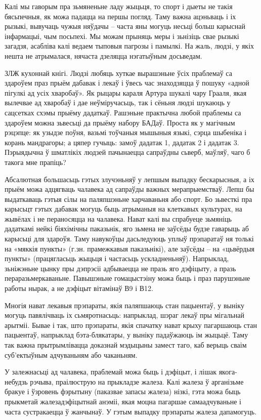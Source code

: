 Калі мы гаворым пра зьмяненьне ладу жыцьця, то спорт і дыеты не такія бясьпечныя, як можа падацца на першы погляд. Таму важна ацэньваць і іх рызыкі, вывучаць чужыя няўдачы – часта яны могуць несьці больш карыснай інфармацыі, чым посьпехі. Мы можам прыняць меры і зьнізіць свае рызыкі загадзя, асабліва калі ведаем тыповыя пагрозы і памылкі. На жаль, людзі, у якіх нешта не атрымалася, нячаста дзеляцца нэгатыўным досьведам.

ЗЛЖ кухоннай кнігі. Людзі любяць хуткае вырашэньне ўсіх праблемаў са здароўем праз прыём дабавак і лекаў і ўвесь час знаходзяцца ў пошуку «адной пігулкі ад усіх хваробаў». Як рыцары караля Артура шукалі чару Грааля, якая вылечвае ад хваробаў і дае неўміручасьць, так і сёньня людзі шукаюць у сацсетках схэмы прыёму дадаткаў. Рашэньне практычна любой праблемы са здароўем можна зьвесьці да прыёму набору БАДаў. Проста як у магічным рэцэпце: як узыдзе поўня, вазьмі тоўчаныя мышыныя языкі, сэрца шыбеніка і корань мандрагоры; а цяпер гучыць: замоў дадатак 1, дадатак 2 і дадатак 3. Пэрыядычна ў шматлікіх людзей пачынаецца сапраўдны сьверб, маўляў, чаго б такога мне прапіць?

Абсалютная большасьць гэтых злучэньняў у лепшым выпадку бескарысныя, а іх прыём можа адцягваць чалавека ад сапраўды важных мерапрыемстваў. Лепш бы выдаткаваць гэтыя сілы на паляпшэньне харчаваньня або спорт. Бо зьвесткі пра карысьцт гэтых дабавак могуць быць атрыманыя на клеткавых культурах, на жывёлах і не пераносяцца на чалавека. Нават калі вы спрабуеце зьмяніць дадаткамі нейкі біяхімічны паказьнік, яго зьмена не заўсёды будзе гаварыць аб карысьці для здароўя. Таму навукоўцы дасьледуюць уплыў прэпаратаў ня толькі на «мяккія пункты» (г.зн. прамежкавыя паказьнікі), але заўсёды – на «цьвёрдыя пункты» (працягласьць жыцьця і частасьць ускладненьняў). Напрыклад, зьніжэньне цынку пры дэпрэсіі адбываецца не празь яго дэфіцыту, а празь пераразьмеркаваньне. Павышэньне гомацыстэіну можа быць і праз парушэньне работы нырак, а не дэфіцыт вітамінаў В9 і В12.

Многія нават лекавыя прэпараты, якія паляпшаюць стан пацыентаў, у выніку могуць павялічваць іх сьмяротнасьць: напрыклад, шэраг лекаў пры мігальнай арытміі. Бывае і так, што прэпараты, якія спачатку нават крыху пагаршаюць стан пацыентаў, напрыклад бэта-блякатары, у выніку падаўжаюць ім жыцьцё. Таму так важна прытрымлівацца доказнай мэдыцыны замест таго, каб верыць сваім суб'ектыўным адчуваньням або чаканьням.

У залежнасьці ад чалавека, праблемай можа быць і дэфіцыт, і лішак якога-небудзь рэчыва, праілюструю на прыкладзе жалеза. Калі жалеза ў арганізьме бракуе і ўзровень фэрытыну (паказвае запасы жалеза) нізкі, гэта можа быць прыкметай жалезадэфіцытнай анэміі, якая моцна пагаршае самаадчуваньне і часта сустракаецца ў жанчынаў. У гэтым выпадку прэпараты жалеза дапамогуць.

